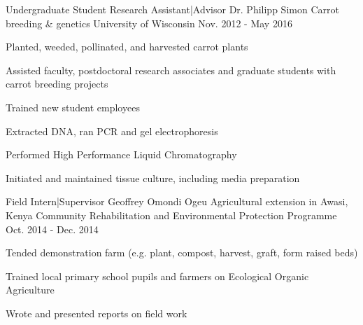 \begin{cventries}
  \cventry
    {Undergraduate Student Research Assistant|Advisor Dr. Philipp Simon} %
    {Carrot breeding \& genetics} %
    {University of Wisconsin} %
    {Nov. 2012 - May 2016} %
    {
      \begin{cvitems} %
        \item {Planted, weeded, pollinated, and harvested carrot plants}
        \item {Assisted faculty, postdoctoral research associates and graduate students with carrot breeding projects}
        \item {Trained new student employees}
        \item {Extracted DNA, ran PCR and gel electrophoresis}
        \item {Performed High Performance Liquid Chromatography}
        \item {Initiated and maintained tissue culture, including media preparation}
      \end{cvitems}
    }

  \cventry
    {Field Intern|Supervisor Geoffrey Omondi Ogeu} %
    {Agricultural extension in Awasi, Kenya} %
    {Community Rehabilitation and Environmental Protection Programme} %
    {Oct. 2014 - Dec. 2014} %
    {
      \begin{cvitems} %
        \item {Tended demonstration farm (e.g. plant, compost, harvest, graft, form raised beds)}
        \item {Trained local primary school pupils and farmers on Ecological Organic Agriculture}
        \item {Wrote and presented reports on field work}
      \end{cvitems}
    }

\end{cventries}
